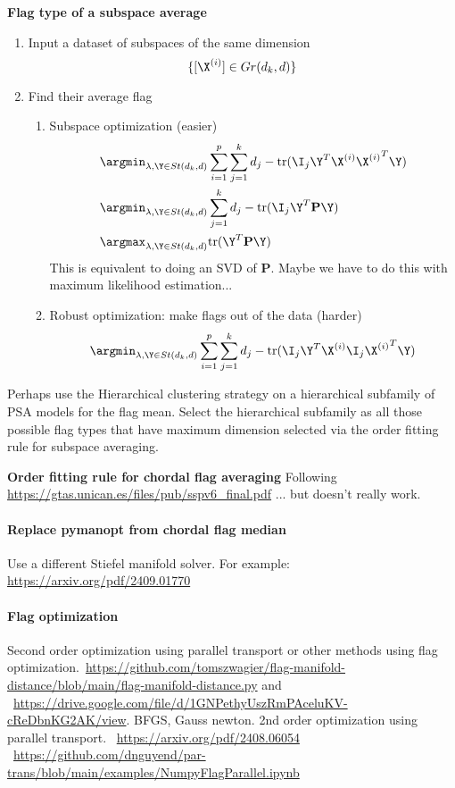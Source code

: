     
\textbf{Flag type of a subspace average}
\begin{enumerate}
    \item Input a dataset of subspaces of the same dimension
    \begin{equation*}
        \{[ \X^{(i)} ]  \in Gr(d_k,d)\}
    \end{equation*}
    \item Find their average flag
    \begin{enumerate}
        \item Subspace optimization (easier)
        \begin{align*}
            &\argmin_{\lambda, \Y \in St(d_k,d)} \sum_{i=1}^p \sum_{j=1}^{k} d_j - \text{tr}(\I_j\Y^T\X^{(i)}{\X^{(i)}}^T\Y)\\
            &\argmin_{\lambda, \Y \in St(d_k,d)} \sum_{j=1}^{k} d_j - \text{tr}(\I_j\Y^T\mathbf{P}\Y)\\
            &\argmax_{\lambda, \Y \in St(d_k,d)} \text{tr}(\Y^T\mathbf{P}\Y)
        \end{align*}
        This is equivalent to doing an SVD of $\mathbf{P}$. Maybe we have to do this with maximum likelihood estimation... 
        \item Robust optimization: make flags out of the data (harder)
        \begin{equation*}
            \argmin_{\lambda, \Y \in St(d_k,d)} \sum_{i=1}^p \sum_{j=1}^{k} d_j - \text{tr}(\I_j\Y^T\X^{(i)}\I_j{\X^{(i)}}^T\Y)
        \end{equation*}
    \end{enumerate}
\end{enumerate}
Perhaps use the Hierarchical clustering strategy on a hierarchical subfamily of PSA models for the flag mean. Select the hierarchical subfamily as all those possible flag types that have maximum dimension selected via the order fitting rule for subspace averaging.


\textbf{Order fitting rule for chordal flag averaging}
Following \url{https://gtas.unican.es/files/pub/sspv6_final.pdf} ... but doesn't really work.

\paragraph{Replace pymanopt from chordal flag median}
Use a different Stiefel manifold solver. For example: \url{https://arxiv.org/pdf/2409.01770}


\paragraph{Flag optimization}
Second order optimization using parallel transport or other methods using flag optimization.~\url{https://github.com/tomszwagier/flag-manifold-distance/blob/main/flag-manifold-distance.py} and ~\url{https://drive.google.com/file/d/1GNPethyUszRmPAceluKV-cReDbnKG2AK/view}. BFGS, Gauss newton. 2nd order optimization using parallel transport. ~\url{https://arxiv.org/pdf/2408.06054} ~\url{https://github.com/dnguyend/par-trans/blob/main/examples/NumpyFlagParallel.ipynb}




